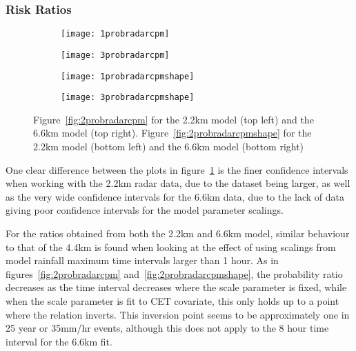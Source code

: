 \subsubsection{Risk Ratios}

\begin{figure}[H]
    \centering
    \begin{subfigure}{0.48\textwidth}
        \centering
        \texttt{[image: 1probradarcpm]}
    \end{subfigure}
    \hfill
    \begin{subfigure}{0.48\textwidth}
        \centering
        \texttt{[image: 3probradarcpm]}
    \end{subfigure}
    \begin{subfigure}{0.48\textwidth}
        \centering
        \texttt{[image: 1probradarcpmshape]}
    \end{subfigure}
    \hfill
    \begin{subfigure}{0.48\textwidth}
        \centering
        \texttt{[image: 3probradarcpmshape]}
    \end{subfigure}
    \caption[Figures~\ref{fig:2probradarcpm} and~\ref{fig:2probradarcpmshape} for the 2.2km and 6.6km models.]{
        Figure~\ref{fig:2probradarcpm} for the 2.2km model (top left) and the 6.6km model (top right).
    Figure~\ref{fig:2probradarcpmshape} for the 2.2km model (bottom left) and the 6.6km model (bottom right)}
    \label{fig:13probradarcpm}
\end{figure}

One clear difference between the plots in figure~\ref{fig:13probradarcpm} is the finer confidence intervals
    when working with the 2.2km radar data, due to the dataset being larger,
    as well as the very wide confidence intervals for the 6.6km data,
    due to the lack of data giving poor confidence intervals for the model parameter scalings.

For the ratios obtained from both the 2.2km and 6.6km model,
    similar behaviour to that of the 4.4km is found when looking at the effect of using scalings from model rainfall maximum time intervals larger than 1 hour.
As in figures~\ref{fig:2probradarcpm} and~\ref{fig:2probradarcpmshape},
    the probability ratio decreases as the time interval decreases where the scale parameter is fixed,
    while when the scale parameter is fit to CET covariate,
    this only holds up to a point where the relation inverts.
This inversion point seems to be approximately one in 25 year or 35mm/hr events,
    although this does not apply to the 8 hour time interval for the 6.6km fit.

